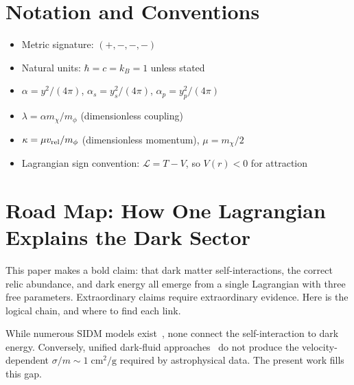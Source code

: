 \documentclass[12pt,a4paper]{article}
\newcommand{\Lc}{\mathcal{L}}
\newcommand{\alphass}{\alpha_s}
\newcommand{\alphapp}{\alpha_p}
\begin{document}
\tableofcontents
\newpage

\section*{Notation and Conventions}

\begin{itemize}
  \item Metric signature: $(+,-,-,-)$
  \item Natural units: $\hbar = c = k_B = 1$ unless stated
  \item $\alpha = y^2/(4\pi)$, $\alphass = y_s^2/(4\pi)$, $\alphapp = y_p^2/(4\pi)$
  \item $\lambda = \alpha m_\chi / m_\phi$ (dimensionless coupling)
  \item $\kappa = \mu v_{\rm rel}/m_\phi$ (dimensionless momentum), $\mu = m_\chi/2$
  \item Lagrangian sign convention: $\Lc = T - V$, so $V(r) < 0$ for attraction
\end{itemize}

\newpage
\section*{Road Map: How One Lagrangian Explains the Dark Sector}
\label{sec:roadmap}

This paper makes a bold claim: that dark matter self-interactions, the
correct relic abundance, and dark energy all emerge from a single
Lagrangian with three free parameters. Extraordinary claims require
extraordinary evidence. Here is the logical chain, and where to find each link.

While numerous SIDM models
exist~\cite{Tulin2018,Kaplinghat2016,Kahlhoefer2017}, none connect the
self-interaction to dark energy. Conversely, unified dark-fluid
approaches~\cite{Kamenshchik2001,Berezhiani2015} do not produce the
velocity-dependent $\sigma/m \sim 1\;\text{cm}^2/\text{g}$ required by
astrophysical data. The present work fills this gap.
\end{document}
